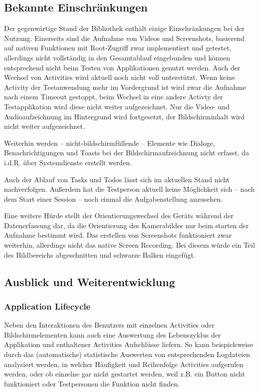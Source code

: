 \subsection{Bekannte Einschränkungen}
Der gegenwärtige Stand der Bibliothek enthält einige Einschränkungen bei der Nutzung. 
Einerseits sind die Aufnahme von Videos und Screenshots, basierend auf nativen Funktionen mit Root-Zugriff zwar implementiert und getestet, allerdings nicht vollständig in den Gesamtablauf eingebunden und können entsprechend nicht beim Testen von Applikationen genutzt werden.
Auch der Wechsel von Activities wird aktuell noch nicht voll unterstützt.
Wenn keine Activity der Testanwendung mehr im Vordergrund ist wird zwar die Aufnahme nach einem Timeout gestoppt, beim Wechsel in eine andere Activty der Testapplikation wird diese nicht weiter aufgezeichnet.
Nur die Video- und Audioaufzeichnung im Hintergrund wird fortgesetzt, der Bildschirminhalt wird nicht weiter aufgezeichnet.

Weiterhin werden -- nicht-bildschirmfüllende -- Elemente wie Dialoge, Benachrichtigungen und Toasts bei der Bildschirmaufzeichnung nicht erfasst, da i.d.R. über Systemdienste erstellt werden.

Auch der Ablauf von Tasks und Todos lässt sich im aktuellen Stand nicht nachverfolgen.
Außerdem hat die Testperson aktuell keine Möglichkeit sich -- nach dem Start einer Session -- noch einmal die Aufgabenstellung anzusehen.

Eine weitere Hürde stellt der Orientierungswechsel des Geräts während der Datenerfassung dar, da die Orientierung des Kamerabildes nur beim starten der Aufnahme bestimmt wird.
Das erstellen von Screenshots funktioniert zwar weiterhin, allerdings nicht das native Screen Recording.
Bei diesem würde ein Teil des Bildbereichs abgeschnitten und schwarze Balken eingefügt.
 
 
\subsection{Ausblick und Weiterentwicklung}

\subsubsection{Application Lifecycle}
Neben den Interaktionen des Benutzers mit einzelnen Activities oder Bildschirmelementen kann auch eine Auswertung des Lebenszyklus der Applikation und enthaltener Activities Aufschlüsse liefern.
So kann beispielsweise durch das (automatische) statistische Auswerten von entsprechenden Logdateien analysiert werden, in welcher Häufigkeit und Reihenfolge Activities aufgerufen werden, oder ob einzelne gar nicht gestartet werden, weil z.B. ein Button nicht funktioniert oder Testpersonen die Funktion nicht finden.

